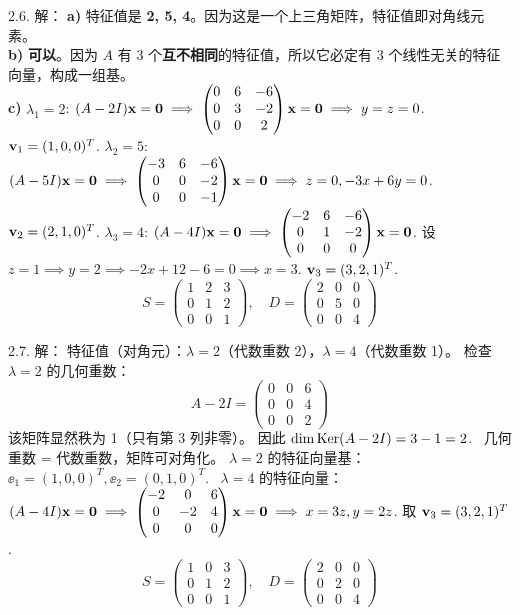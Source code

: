 \begin{exer}
2.6. 解：
\textbf{a)} 特征值是 \textbf{2, 5, 4}。因为这是一个上三角矩阵，特征值即对角线元素。\\
\textbf{b)} \textbf{可以}。因为 $A$ 有 3 个\textbf{互不相同}的特征值，所以它必定有 3 个线性无关的特征向量，构成一组基。\\
\textbf{c)}
$\lambda_1 = 2$: $(A-2I)\mathbf{x} = \mathbf{0} \implies \begin{pmatrix} 0 & 6 & -6 \\ 0 & 3 & -2 \\ 0 & 0 & 2 \end{pmatrix} \mathbf{x} = \mathbf{0} \implies y=z=0$. $\mathbf{v}_1 = (1, 0, 0)^T$.
$\lambda_2 = 5$: $(A-5I)\mathbf{x} = \mathbf{0} \implies \begin{pmatrix} -3 & 6 & -6 \\ 0 & 0 & -2 \\ 0 & 0 & -1 \end{pmatrix} \mathbf{x} = \mathbf{0} \implies z=0, -3x+6y=0$. $\mathbf{v}_2 = (2, 1, 0)^T$.
$\lambda_3 = 4$: $(A-4I)\mathbf{x} = \mathbf{0} \implies \begin{pmatrix} -2 & 6 & -6 \\ 0 & 1 & -2 \\ 0 & 0 & 0 \end{pmatrix} \mathbf{x} = \mathbf{0}$. 设 $z=1 \implies y=2 \implies -2x + 12 - 6 = 0 \implies x=3$. $\mathbf{v}_3 = (3, 2, 1)^T$.
$$ S = \begin{pmatrix} 1 & 2 & 3 \\ 0 & 1 & 2 \\ 0 & 0 & 1 \end{pmatrix}, \quad D = \begin{pmatrix} 2 & 0 & 0 \\ 0 & 5 & 0 \\ 0 & 0 & 4 \end{pmatrix} $$

2.7. 解：
特征值（对角元）：$\lambda = 2$（代数重数 2），$\lambda = 4$（代数重数 1）。
检查 $\lambda = 2$ 的几何重数：
$$ A - 2I = \begin{pmatrix} 0 & 0 & 6 \\ 0 & 0 & 4 \\ 0 & 0 & 2 \end{pmatrix} $$
该矩阵显然秩为 1（只有第 3 列非零）。
因此 $\dim \operatorname{Ker}(A-2I) = 3 - 1 = 2$.~
几何重数 = 代数重数，矩阵可对角化。
$\lambda = 2$ 的特征向量基：$\ee_1 = (1, 0, 0)^T, \ee_2 = (0, 1, 0)^T$.~
$\lambda = 4$ 的特征向量：$(A-4I)\mathbf{x} = \mathbf{0} \implies \begin{pmatrix} -2 & 0 & 6 \\ 0 & -2 & 4 \\ 0 & 0 & 0 \end{pmatrix} \mathbf{x} = \mathbf{0} \implies x=3z, y=2z$. 取 $\mathbf{v}_3 = (3, 2, 1)^T$.
$$ S = \begin{pmatrix} 1 & 0 & 3 \\ 0 & 1 & 2 \\ 0 & 0 & 1 \end{pmatrix}, \quad D = \begin{pmatrix} 2 & 0 & 0 \\ 0 & 2 & 0 \\ 0 & 0 & 4 \end{pmatrix} $$


\end{exer}
